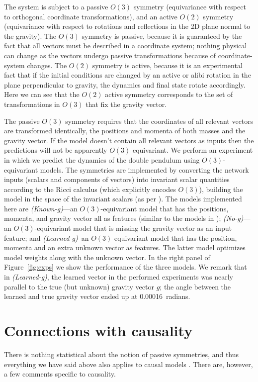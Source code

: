 \documentclass{article} %
\newcommand{\figref}[1]{Figure~\ref{#1}}
\begin{document}
The system is subject to a passive $O(3)$ symmetry (equivariance with respect to orthogonal coordinate transformations), and an active $O(2)$ symmetry (equivariance with respect to rotations and reflections in the 2D plane normal to the gravity). 
The $O(3)$ symmetry is passive, because it is guaranteed by the fact that all vectors must be described in a coordinate system; nothing physical can change as the vectors undergo passive transformations because of coordinate-system changes.
The $O(2)$ symmetry is active, because it is an experimental fact that if the initial conditions are changed by an active or alibi rotation in the plane perpendicular to gravity, the dynamics and final state rotate accordingly.
Here we can see that the $O(2)$ active symmetry corresponds to the set of transformations in $O(3)$ that fix the gravity vector. 

The passive $O(3)$ symmetry requires that the coordinates of all relevant vectors are transformed identically, the positions and momenta of both masses and the gravity vector.
If the model doesn't contain all relevant vectors as inputs then the predictions will not be apparently $O(3)$ equivariant.
We perform an experiment in which we predict the dynamics of the double pendulum using $O(3)$-equivariant models.
The symmetries are implemented by converting the network inputs (scalars and components of vectors) into invariant scalar quantities according to the Ricci calculus (which explicitly encodes $O(3)$), building the model in the space of the invariant scalars (as per \citealt{villar2021scalars}).
The models implemented here are \textsl{(Known-g)}---an $O(3)$-equivariant model that has the positions, momenta, and gravity vector all as features (similar to the models in \citealt{villar2021scalars, yao2021simple}); \textsl{(No-g)}---an $O(3)$-equivariant model that is missing the gravity vector as an input feature; and \textsl{(Learned-g)}\---an $O(3)$-equivariant model that has the position, momenta and an extra unknown vector as features.
The latter model optimizes model weights along with the unknown vector. 
In the right panel of \figref{fig:exps} we show the performance of the three models.
We remark that in \textsl{(Learned-g)}, the learned vector in the performed experiments was nearly parallel to the true (but unknown) gravity vector $g$; the angle between the learned and true gravity vector ended up at 0.00016~radians.

\section{Connections with causality}\label{sec:causality}
There is nothing statistical about the notion of passive symmetries, and thus everything we have said above also applies to causal models \citep{PetJanSch17}.
There are, however, a few comments specific to causality.
\end{document}
